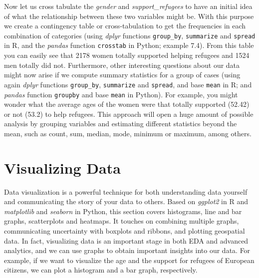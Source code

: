 Now let us cross tabulate the \textit{gender} and \textit{support\_refugees} to have an initial idea of what the relationship between these two variables might be. With this purpose we create a contingency table or cross-tabulation to get the frequencies in each combination of categories (using \emph{dplyr} functions \texttt{group\_by}, \texttt{summarize} and \texttt{spread} in R, and the \emph{pandas} function \texttt{crosstab} in Python; example 7.4). From this table you can easily see that 2178 women totally supported helping refugees and 1524 men totally did not.  Furthermore, other interesting questions about our data might now arise if we compute summary statistics for a group of cases (using again \emph{dplyr} functions \texttt{group\_by}, \texttt{summarize} and \texttt{spread}, and base \texttt{mean} in R; and \emph{pandas} function \texttt{groupby} and base \texttt{mean} in Python). For example, you might wonder what  the average ages of the women were that totally supported (52.42) or not (53.2) to help  refugees.  This approach will open a huge amount of possible analysis by grouping variables and estimating different statistics beyond the mean, such as count, sum, median, mode, minimum or maximum, among others.



%
\section{Visualizing Data}
\label{sec:visualization}


Data visualization is a powerful technique for both understanding data yourself and communicating the story of your data to others. Based on \emph{ggplot2} in R and \emph{matplotlib} and \emph{seaborn} in Python, this section covers histograms, line and bar graphs, scatterplots and heatmaps. It touches on combining multiple graphs, communicating uncertainty with boxplots and ribbons, and plotting geospatial data.  In fact, visualizing data is an important stage in both EDA and advanced analytics, and we can use graphs to obtain important insights into our data. For example, if we want to visualize the age and the support for refugees of European citizens, we can plot a histogram and a bar graph, respectively.

